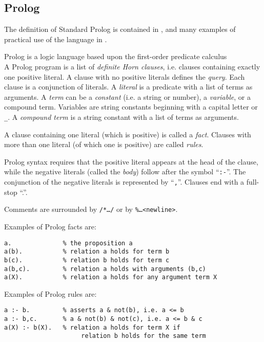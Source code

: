 \subsection{Prolog}

The definition of Standard Prolog is contained in \cite{DEDC96}, and many
examples of practical use of the language in \cite{CM87}.

Prolog is a logic language based upon the first-order predicate calculus\\
A Prolog program
is a list of \textit{definite Horn clauses}, i.e. clauses containing exactly one
positive literal.  A clause with no positive literals defines the \textit{query}.
Each clause is a conjunction of literals.  A \textit{literal} is a predicate with
a list of terms as arguments.  A \textit{term} can be a \textit{constant} (i.e.
a string or number), a \textit{variable}, or a compound term. 
Variables are string constants beginning with a capital letter or \texttt{\_{}}.
A \textit{compound term}
is a string constant with a list of terms as arguments.

A clause containing one literal (which is positive) is called a \textit{fact}.  Clauses
with more than one literal (of which one is positive) are called \textit{rules}.

Prolog syntax requires that the positive literal appears at the head of the clause,
while the negative literals (called the \textit{body})
follow after the symbol ``\texttt{:-}''.  The conjunction of
the negative literals is represented by ``\texttt{,}''.
Clauses end with a full-stop ``.''.

Comments are surrounded by \texttt{/*\ldots*/} or by \texttt{\%\ldots<newline>}.

Examples of Prolog facts are:
\begin{verbatim}
a.              % the proposition a
a(b).           % relation a holds for term b
b(c).           % relation b holds for term c
a(b,c).         % relation a holds with arguments (b,c)
a(X).           % relation a holds for any argument term X
\end{verbatim}

Examples of Prolog rules are:
\begin{verbatim}
a :- b.         % asserts a & not(b), i.e. a <= b
a :- b,c.       % a & not(b) & not(c), i.e. a <= b & c
a(X) :- b(X).   % relation a holds for term X if
                     relation b holds for the same term
\end{verbatim}

